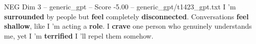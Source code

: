 \begin{textsample}{NEG Dim 3 – generic\_gpt – Score -5.00 – generic\_gpt/t1423\_gpt.txt}  \label{ex:f3_neg_015}
I ’m \textbf{surrounded} by people but \textbf{feel} completely \textbf{disconnected}.
Conversations \textbf{feel} \textbf{shallow}, like I ’m acting a \textbf{role}.
I \textbf{crave} one person who genuinely understands me, yet I ’m \textbf{terrified} I ’ll repel them somehow.

\end{textsample}
